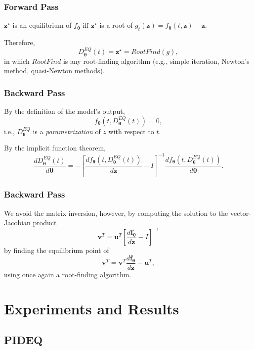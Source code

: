 \documentclass[t]{beamer}
\begin{document}
\begin{frame}
    \frametitle{Forward Pass}
    $\bm{z}^{\star}$ is an equilibrium of $f_{\bm{\theta}}$ iff $\bm{z}^{\star}$ is a root of $g_t(\bm{z}) = f_{\bm{\theta}}(t,\bm{z}) - \bm{z}$.
    \linebreak \pause

    Therefore, \[
    D^{EQ}_{\bm{\theta}}(t) = \bm{z}^{\star} = RootFind(g)
    ,\] in which $RootFind$ is any root-finding algorithm (e.g., simple iteration, Newton's method, quasi-Newton methods).
\end{frame}

\begin{frame}
    \frametitle{Backward Pass}
    By the definition of the model's output, \[
	f_{\bm{\theta}}(t,D^{EQ}_{\bm{\theta}}(t)) = 0
    ,\] i.e., $D^{EQ}_{\bm{\theta}}$ is a \emph{parametrization} of $z$ with respect to $t$.
    \linebreak \pause

    By the implicit function theorem, \[
	\frac{d D^{EQ}_{\bm{\theta}}(t)}{d \bm{\theta}} = - \left[ \frac{d f_{\bm{\theta}}(t,D^{EQ}_{\bm{\theta}}(t))}{d \bm{z}} - I \right]^{-1} \frac{d f_{\bm{\theta}}(t,D^{EQ}_{\bm{\theta}}(t))}{d \bm{\theta}}
    .\] 
\end{frame}

\begin{frame}
    \frametitle{Backward Pass}
    We avoid the matrix inversion, however, by computing the solution to the vector-Jacobian product \[
    \bm{v}^T = \bm{u}^T\left[ \frac{d \bm{f}_{\bm{\theta}}}{d \bm{z}} - I \right]^{-1}
    \] by finding the equilibrium point of \[
    \bm{v}^T = \bm{v}^T \frac{d \bm{f}_{\bm{\theta}}}{d \bm{z}} - \bm{u}^T
    ,\] using once again a root-finding algorithm.
    
\end{frame}

\section{Experiments and Results}

\subsection{PIDEQ}
\end{document}
